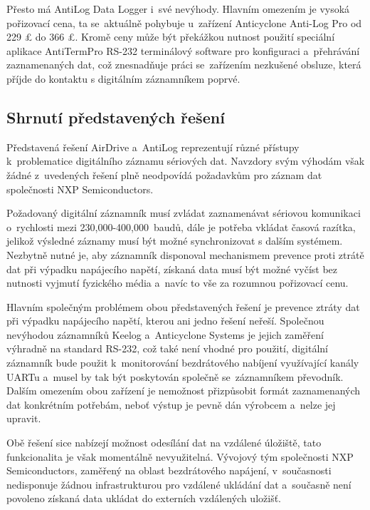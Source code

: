 Přesto má AntiLog Data Logger i~své nevýhody. Hlavním omezením je vysoká pořizovací cena, ta se~aktuálně pohybuje u~zařízení Anticyclone Anti-Log Pro od 229 £ do 366 £. Kromě ceny může být překážkou nutnost použití speciální aplikace AntiTermPro RS-232 terminálový software pro konfiguraci a~přehrávání zaznamenaných dat, což znesnadňuje práci se~zařízením nezkušené obsluze, která příjde do kontaktu s digitálním záznamníkem poprvé.~\cite{anticyclone_systems_antilog_pro, anticyclone_systems_antilog_pro_price}

\subsection{Shrnutí představených řešení}

Představená řešení AirDrive a~AntiLog reprezentují různé přístupy k~problematice digitálního záznamu sériových dat. Navzdory svým výhodám však žádné z~uvedených řešení plně neodpovídá požadavkům pro záznam dat společnosti NXP Semiconductors. 

Požadovaný digitální záznamník musí zvládat zaznamenávat sériovou komunikaci o~rychlosti mezi 230,000-400,000~baudů, dále je potřeba vkládat časová razítka, jelikož výsledné záznamy musí být možné synchronizovat s dalším systémem. Nezbytně nutné je, aby záznamník disponoval mechanismem prevence proti ztrátě dat při výpadku napájecího napětí, získaná data musí být možné vyčíst bez nutnosti vyjmutí fyzického média a~navíc to vše za rozumnou pořizovací cenu.

Hlavním společným problémem obou představených řešení je prevence ztráty dat při výpadku napájecího napětí, kterou ani jedno řešení neřeší. Společnou nevýhodou záznamníků Keelog a~Anticyclone Systems je jejich zaměření výhradně na standard RS-232, což také není vhodné pro použití, digitální záznamník bude použit k~monitorování bezdrátového nabíjení využívající kanály UARTu a~musel by tak být poskytován společně se~záznamníkem převodník. Dalším omezením obou zařízení je nemožnost přizpůsobit formát zaznamenaných dat konkrétním potřebám, neboť výstup je pevně dán výrobcem a~nelze jej upravit.

Obě řešení sice nabízejí možnost odesílání dat na vzdálené úložiště, tato funkcionalita je však momentálně nevyužitelná. Vývojový tým společnosti NXP Semiconductors, zaměřený na oblast bezdrátového napájení, v~současnosti nedisponuje žádnou infrastrukturou pro vzdálené ukládání dat a~současně není povoleno získaná data ukládat do externích vzdálených uložišť.

